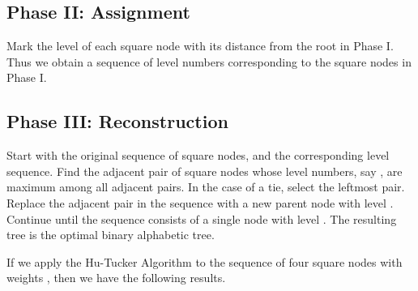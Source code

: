 \documentclass[12pt]{article}
\begin{document}
\subsection*{Phase II: Assignment}

Mark the level of each square node with its distance from the root in Phase I.
Thus we obtain a sequence of level numbers  corresponding
to the  square nodes in Phase I.

\subsection*{Phase III: Reconstruction}

Start with the original sequence of  square nodes, and the corresponding level
sequence.  Find the adjacent pair of square nodes whose level numbers, say ,
are maximum among all adjacent pairs. In the case of a tie, select the leftmost
pair. Replace the adjacent pair in the sequence with a new parent node with level
. Continue until the sequence consists of a single node with level . The
resulting tree is the optimal binary alphabetic tree.
\vspace{1em}
\par

If we apply the Hu-Tucker Algorithm to the sequence of four square nodes with
weights , then we have the following results.
\end{document}

